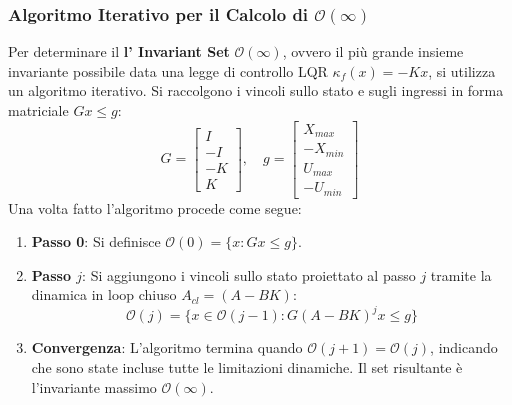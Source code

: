 \subsubsection{Algoritmo Iterativo per il Calcolo di $\mathcal{O}(\infty)$}
Per determinare il \textbf{l' Invariant Set} $\mathcal{O}(\infty)$, ovvero il più grande insieme invariante possibile data una legge di controllo LQR $\kappa_f(x) = -Kx$, si utilizza un algoritmo iterativo. 
Si raccolgono i vincoli sullo stato e sugli ingressi in forma matriciale $Gx \le g$:
\begin{equation}
	G = \begin{bmatrix} I \\ -I \\ -K \\ K \end{bmatrix}, \quad g = \begin{bmatrix} X_{max} \\ -X_{min} \\ U_{max} \\ -U_{min} \end{bmatrix}
\end{equation}
Una volta fatto l'algoritmo procede come segue:
\begin{enumerate}
	\item \textbf{Passo 0}: Si definisce $\mathcal{O}(0) = \{x : Gx \le g\}$.
	\item \textbf{Passo $j$}: Si aggiungono i vincoli sullo stato proiettato al passo $j$ tramite la dinamica in loop chiuso $A_{cl} = (A-BK)$:
	\begin{equation}
		\mathcal{O}(j) = \{x \in \mathcal{O}(j-1) : G(A-BK)^j x \le g\}
	\end{equation}
	\item \textbf{Convergenza}: L'algoritmo termina quando $\mathcal{O}(j+1) = \mathcal{O}(j)$, indicando che sono state incluse tutte le limitazioni dinamiche. Il set risultante è l'invariante massimo $\mathcal{O}(\infty)$.
\end{enumerate}
